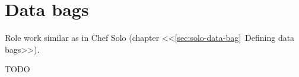 \section{Data bags}

Role work similar as in Chef Solo (chapter <<\ref{sec:solo-data-bag}~Defining data bags>>).

TODO